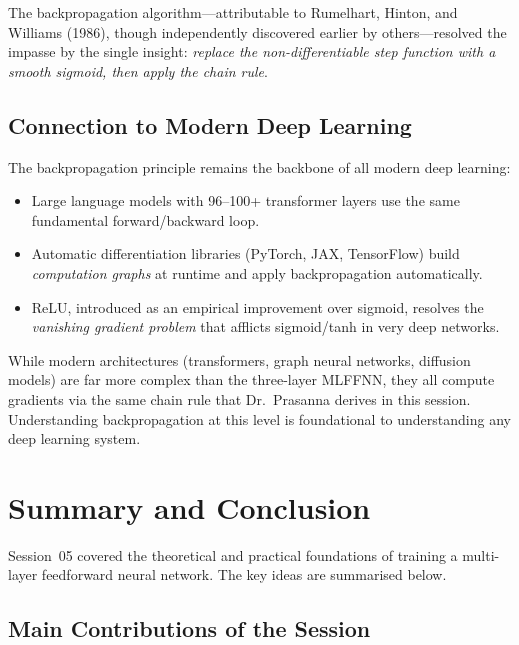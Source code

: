 \documentclass[12pt,a4paper]{article}
\begin{document}
The backpropagation algorithm---attributable to Rumelhart, Hinton, and
Williams (1986), though independently discovered earlier by others---resolved
the impasse by the single insight: \emph{replace the non-differentiable step
function with a smooth sigmoid, then apply the chain rule}.

\subsection{Connection to Modern Deep Learning}
\label{subsec:modern}

The backpropagation principle remains the backbone of all modern deep learning:
\begin{itemize}
  \item Large language models with 96--100+ transformer layers use the same
    fundamental forward/backward loop.
  \item Automatic differentiation libraries (PyTorch, JAX, TensorFlow) build
    \emph{computation graphs} at runtime and apply backpropagation
    automatically.
  \item ReLU, introduced as an empirical improvement over sigmoid, resolves the
    \emph{vanishing gradient problem} that afflicts sigmoid/tanh in very deep
    networks.
\end{itemize}

\begin{keyinsight}[title=Backpropagation Today]
  While modern architectures (transformers, graph neural networks, diffusion
  models) are far more complex than the three-layer MLFFNN, they all compute
  gradients via the same chain rule that Dr.~Prasanna derives in this session.
  Understanding backpropagation at this level is foundational to understanding
  any deep learning system.
\end{keyinsight}

\section{Summary and Conclusion}
\label{sec:summary}

Session~05 covered the theoretical and practical foundations of training a
multi-layer feedforward neural network.  The key ideas are summarised below.

\subsection*{Main Contributions of the Session}
\end{document}
